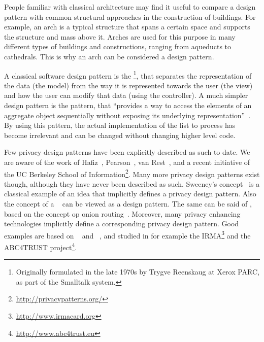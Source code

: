 People familiar with classical architecture may find it useful to compare a design pattern with common structural approaches in the construction of buildings. For example, an arch is a typical structure that spans a certain space and supports the structure and mass above it. Arches are used for this purpose in many different types of buildings and constructions, ranging from aqueducts to cathedrals. This is why an arch can be considered a design pattern. 

A classical software design pattern is the \footnote{Originally formulated in the late 1970s by Trygve Reenskaug at Xerox PARC,
   as part of the Smalltalk system.
}, 
that separates the representation of the data (the model) from the way it is represented towards the user (the view) and how the user can modify that data (using the controller). A much simpler design pattern is the  pattern, that ``provides a way to access the elements of an aggregate object sequentially without exposing its underlying representation''~\cite{gamma1994design-patterns}. By using this pattern, the actual implementation of the list to process has become irrelevant and can be changed without changing higher level code. 


Few privacy design patterns have been explicitly described as such to date. We are aware of the work of Hafiz~\cite{hafiz2006pdp,hafiz2011patternlanguage}, Pearson~\cite{DBLP:conf/trustbus/PearsonS10,pearson2010decision-support},
van Rest~\etal\cite{rest2012designing-privacy}, and a recent initiative of the UC Berkeley School of Information\footnote{\url{http://privacypatterns.org/}
}.
Many more privacy design patterns exist though, although they have never been described as such. Sweeney's  concept~\cite{DBLP:journals/ijufks/Sweene02} is a classical example of an idea that implicitly defines a privacy design pattern. Also the concept of a ~\cite{DBLP:journals/siamcomp/GoldwasserMR89} can be viewed as a design pattern. The same can be said of , based on the concept op onion routing~\cite{DBLP:journals/cacm/Chaum81}. 
Moreover, many privacy enhancing technologies implicitly define a corresponding privacy design pattern. Good examples are  based on ~\cite{DBLP:conf/eurocrypt/CamenischL01} and ~\cite{brands2000pki}, and studied in for example the IRMA\footnote{\url{http://www.irmacard.org}
}
and the ABC4TRUST project\footnote{\url{http://www.abc4trust.eu}
}.




